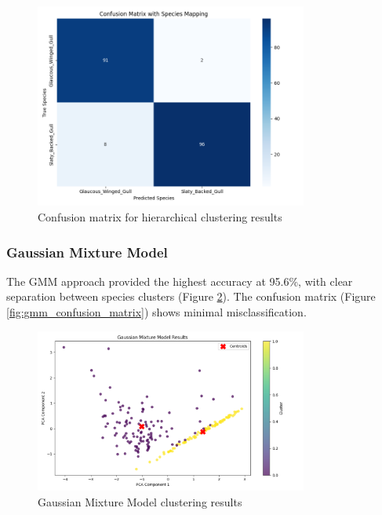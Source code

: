 \documentclass[a4paper,12pt]{report}
\begin{document}
\begin{figure}[H]
    \centering
    \includegraphics[width=0.8\textwidth]{images/clustering/hierarchical_confusion_matrix.png}
    \caption{Confusion matrix for hierarchical clustering results}
    \label{fig:hierarchical_confusion_matrix}
\end{figure}

\subsubsection{Gaussian Mixture Model}
The GMM approach provided the highest accuracy at 95.6\%, with clear separation between species clusters (Figure \ref{fig:gmm_clustering}). The confusion matrix (Figure \ref{fig:gmm_confusion_matrix}) shows minimal misclassification.

\begin{figure}[H]
    \centering
    \includegraphics[width=0.8\textwidth]{images/clustering/gmm_clustering.png}
    \caption{Gaussian Mixture Model clustering results}
    \label{fig:gmm_clustering}
\end{figure}
\end{document}
